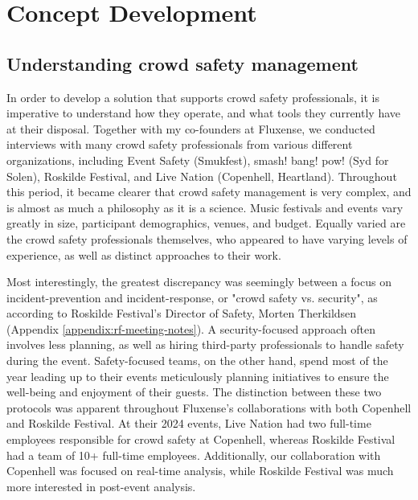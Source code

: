 \chapter{Concept Development}
\label{chap:concept-development}

\section{Understanding crowd safety management}
\label{sec:crowd-safety}

In order to develop a solution that supports crowd safety professionals, it is imperative to understand how they operate, and what tools they currently have at their disposal. Together with my co-founders at Fluxense, we conducted interviews with many crowd safety professionals from various different organizations, including Event Safety (Smukfest), smash! bang! pow! (Syd for Solen), Roskilde Festival, and Live Nation (Copenhell, Heartland). Throughout this period, it became clearer that crowd safety management is very complex, and is almost as much a philosophy as it is a science. Music festivals and events vary greatly in size, participant demographics, venues, and budget. Equally varied are the crowd safety professionals themselves, who appeared to have varying levels of experience, as well as distinct approaches to their work.

Most interestingly, the greatest discrepancy was seemingly between a focus on incident-prevention and incident-response, or "crowd safety vs. security", as according to Roskilde Festival's Director of Safety, Morten Therkildsen (Appendix \ref{appendix:rf-meeting-notes}). A security-focused approach often involves less planning, as well as hiring third-party professionals to handle safety during the event. Safety-focused teams, on the other hand, spend most of the year leading up to their events meticulously planning initiatives to ensure the well-being and enjoyment of their guests. The distinction between these two protocols was apparent throughout Fluxense's collaborations with both Copenhell and Roskilde Festival. At their 2024 events, Live Nation had two full-time employees responsible for crowd safety at Copenhell, whereas Roskilde Festival had a team of 10+ full-time employees. Additionally, our collaboration with Copenhell was focused on real-time analysis, while Roskilde Festival was much more interested in post-event analysis.

